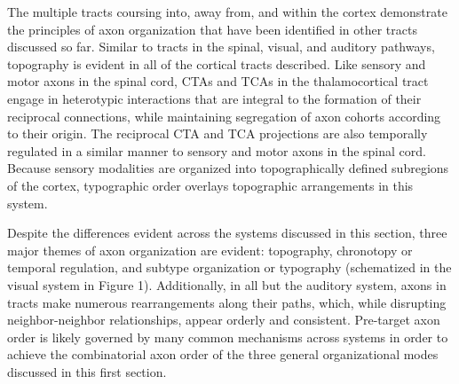 The multiple tracts coursing into, away from, and within the cortex demonstrate the principles of axon organization that have been identified in other tracts discussed so far. 
Similar to tracts in the spinal, visual, and auditory pathways, topography is evident in all of the cortical tracts described. 
Like sensory and motor axons in the spinal cord, CTAs and TCAs in the thalamocortical tract engage in heterotypic interactions that are integral to the formation of their reciprocal connections, while maintaining segregation of axon cohorts according to their origin. 
The reciprocal CTA and TCA projections are also temporally regulated in a similar manner to sensory and motor axons in the spinal cord. 
Because sensory modalities are organized into topographically defined subregions of the cortex, typographic order overlays topographic arrangements in this system. 

Despite the differences evident across the systems discussed in this section, three major themes of axon organization are evident: topography, chronotopy or temporal regulation, and subtype organization or typography (schematized in the visual system in Figure 1). 
Additionally, in all but the auditory system, axons in tracts make numerous rearrangements along their paths, which, while disrupting neighbor-neighbor relationships, appear orderly and consistent. 
Pre-target axon order is likely governed by many common mechanisms across systems in order to achieve the combinatorial axon order of the three general organizational modes discussed in this first section. 